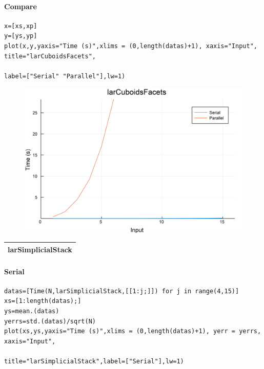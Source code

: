 \documentclass{article}
\begin{document}
\paragraph{Compare}
\begin{flushleft}\small
\begin{list}{}{} \item
    \begin{Verbatim}[tabsize=4]
x=[xs,xp]
y=[ys,yp]
plot(x,y,yaxis="Time (s)",xlims = (0,length(datas)+1), xaxis="Input", title="larCuboidsFacets",
                                                                        label=["Serial" "Parallel"],lw=1)
    \end{Verbatim}
\end{list}
\end{flushleft} 
\begin{figure}[h!]
\centering
\includegraphics[scale=0.06]{larCuboidsFacetsCom.png}
\end{figure}

\vspace{3ex}

\vspace{3ex}

\begin{tabular}{p{16cm}}
\hline
larSimplicialStack\\
\hline
\end{tabular}

\paragraph{Serial}
\begin{flushleft}\small
\begin{list}{}{} \item
    \begin{Verbatim}[tabsize=4]
datas=[Time(N,larSimplicialStack,[[1:j;]]) for j in range(4,15)]
xs=[1:length(datas);]
ys=mean.(datas)
yerrs=std.(datas)/sqrt(N)
plot(xs,ys,yaxis="Time (s)",xlims = (0,length(datas)+1), yerr = yerrs, xaxis="Input",
                                            title="larSimplicialStack",label=["Serial"],lw=1)
    \end{Verbatim}
\end{list}
\end{flushleft} 
\end{document}
